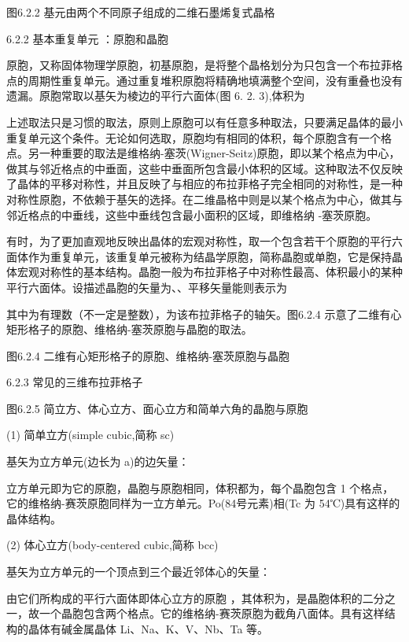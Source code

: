 图6.2.2 基元由两个不同原子组成的二维石墨烯复式晶格



6.2.2 基本重复单元 ：原胞和晶胞

原胞，又称固体物理学原胞，初基原胞，是将整个晶格划分为只包含一个布拉菲格点的周期性重复单元。通过重复堆积原胞将精确地填满整个空间，没有重叠也没有遗漏。原胞常取以基矢为棱边的平行六面体(图 6. 2. 3),体积为



上述取法只是习惯的取法，原则上原胞可以有任意多种取法，只要满足晶体的最小重复单元这个条件。无论如何选取，原胞均有相同的体积，每个原胞含有一个格点。另一种重要的取法是维格纳-塞茨(Wigner-Seitz)原胞，即以某个格点为中心，做其与邻近格点的中垂面，这些中垂面所包含最小体积的区域。这种取法不仅反映了晶体的平移对称性，并且反映了与相应的布拉菲格子完全相同的对称性，是一种对称性原胞，不依赖于基矢的选择。在二维晶格中则是以某个格点为中心，做其与邻近格点的中垂线，这些中垂线包含最小面积的区域，即维格纳 -塞茨原胞。



有时，为了更加直观地反映出晶体的宏观对称性，取一个包含若干个原胞的平行六面体作为重复单元，该重复单元被称为结晶学原胞，简称晶胞或单胞，它是保持晶体宏观对称性的基本结构。晶胞一般为布拉菲格子中对称性最高、体积最小的某种平行六面体。设描述晶胞的矢量为、、平移矢量能则表示为



其中为有理数（不一定是整数），为该布拉菲格子的轴矢。图6.2.4 示意了二维有心矩形格子的原胞、维格纳-塞茨原胞与晶胞的取法。



图6.2.4 二维有心矩形格子的原胞、维格纳-塞茨原胞与晶胞

6.2.3 常见的三维布拉菲格子



图6.2.5 简立方、体心立方、面心立方和简单六角的晶胞与原胞

(1) 简单立方(simple cubic,简称 sc)

基矢为立方单元(边长为 a)的边矢量：



立方单元即为它的原胞，晶胞与原胞相同，体积都为，每个晶胞包含 1 个格点，它的维格纳-赛茨原胞同样为一立方单元。Po(84号元素)相(Tc 为 54℃)具有这样的晶体结构。

(2) 体心立方(body-centered cubic,简称 bcc)

基矢为立方单元的一个顶点到三个最近邻体心的矢量：



由它们所构成的平行六面体即体心立方的原胞 ，其体积为，是晶胞体积的二分之一，故一个晶胞包含两个格点。它的维格纳-赛茨原胞为截角八面体。具有这样结构的晶体有碱金属晶体 Li、Na、K、V、Nb、Ta 等。

